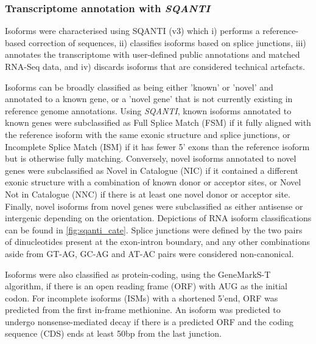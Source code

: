 \subsubsection{Transcriptome annotation with \textit{SQANTI}}
\label{section: sqanti_annotations}
Isoforms were characterised using SQANTI\cite{Tardaguila2018} (v3) which i) performs a reference-based correction of sequences, ii) classifies isoforms based on splice junctions, iii) annotates the transcriptome with user-defined public annotations and matched RNA-Seq data, and iv) discards isoforms that are considered technical artefacts. 

Isoforms can be broadly classified as being either 'known' or 'novel' and annotated to a known gene, or a 'novel gene' that is not currently existing in reference genome annotations. Using \textit{SQANTI}, known isoforms annotated to known genes were subclassified as Full Splice Match (FSM) if it fully aligned with the reference isoform with the same exonic structure and splice junctions, or Incomplete Splice Match (ISM) if it has fewer 5’ exons than the reference isoform but is otherwise fully matching. Conversely, novel isoforms annotated to novel genes were subclassified as Novel in Catalogue (NIC) if it contained a different exonic structure with a combination of known donor or acceptor sites, or Novel Not in Catalogue (NNC) if there is at least one novel donor or acceptor site. Finally, novel isoforms from novel genes were subclassified as either antisense or intergenic depending on the orientation. Depictions of RNA isoform classifications can be found in \cref{fig:sqanti_cate}. Splice junctions were defined by the two pairs of dinucleotides present at the exon-intron boundary, and any other combinations aside from GT-AG, GC-AG and AT-AC pairs were considered non-canonical. 

Isoforms were also classified as protein-coding, using the GeneMarkS-T algorithm\cite{Tang2015}, if there is an open reading frame (ORF) with AUG as the initial codon. For incomplete isoforms (ISMs) with a shortened 5'end, ORF was predicted from the first in-frame methionine. An isoform was predicted to undergo nonsense-mediated decay if there is a predicted ORF and the coding sequence (CDS) ends at least 50bp from the last junction. 

